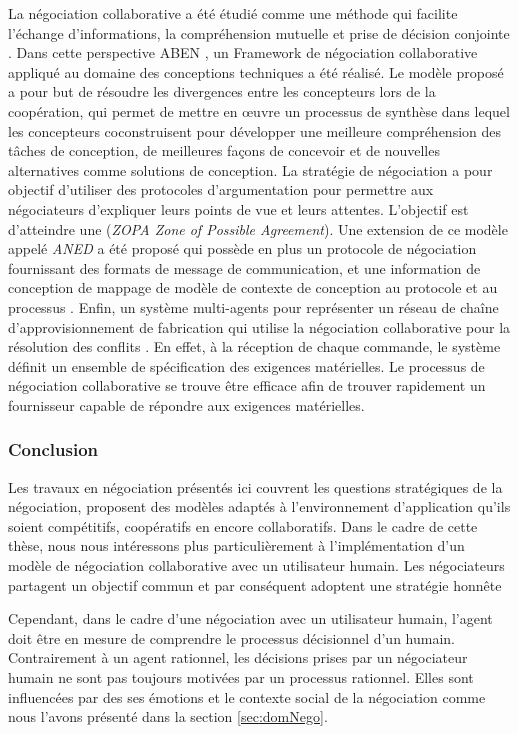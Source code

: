 		La négociation collaborative a été étudié comme une méthode qui facilite l'échange d'informations, la compréhension mutuelle et prise de décision conjointe \cite{jin2010study}. 
		Dans cette perspective ABEN \cite{jin2009argumentation}, un Framework de négociation collaborative appliqué au domaine des conceptions techniques a été réalisé. Le modèle proposé a pour but de résoudre les divergences entre les concepteurs lors de la coopération, qui permet de mettre en œuvre un processus de synthèse dans lequel les concepteurs coconstruisent pour développer une meilleure compréhension des tâches de conception, de meilleures façons de concevoir et de nouvelles alternatives comme solutions de conception. La stratégie de négociation a pour objectif d'utiliser des protocoles d'argumentation pour permettre aux négociateurs d'expliquer leurs points de vue et leurs attentes. L'objectif est d'atteindre une (\emph{ZOPA  Zone of Possible Agreement}). Une extension de ce modèle appelé \emph{ANED} a été proposé qui possède en plus un protocole de négociation fournissant des formats de message de communication, et une information de conception de mappage de modèle de contexte de conception au protocole et au processus \cite{jin2010study}. 	
		Enfin, un système multi-agents pour représenter un réseau de chaîne d'approvisionnement de fabrication qui utilise la négociation collaborative pour la résolution des conflits \cite{jiao2006agent}. En effet, à la réception de chaque commande, le système définit un ensemble de spécification des exigences matérielles. Le processus de négociation collaborative se trouve être efficace afin de trouver rapidement un fournisseur capable de répondre aux exigences matérielles.
		\subsubsection{Conclusion}
		  
		Les travaux en négociation présentés ici couvrent les questions stratégiques de la négociation, proposent des modèles adaptés à l'environnement d'application qu'ils soient compétitifs, coopératifs en encore collaboratifs.  Dans le cadre de cette thèse, nous nous intéressons plus particulièrement à l'implémentation d'un modèle de négociation collaborative avec un utilisateur humain. Les négociateurs partagent un objectif commun et par conséquent adoptent une stratégie honnête
		
		 Cependant, dans le cadre d'une négociation avec un utilisateur humain, l'agent doit être en mesure de comprendre le processus décisionnel d'un humain. Contrairement à un agent rationnel, les décisions prises par un négociateur humain ne sont pas toujours motivées par un processus rationnel. Elles sont influencées par des ses émotions et le contexte social de la négociation comme nous l'avons présenté dans la section \ref{sec:domNego}. 
		 
